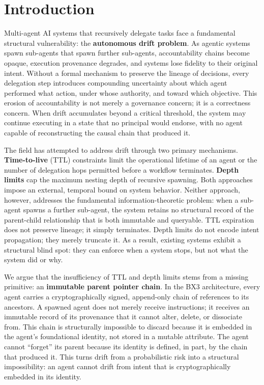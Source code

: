 \section{Introduction}

Multi-agent AI systems that recursively delegate tasks face a fundamental structural vulnerability: the \textbf{autonomous drift problem}. As agentic systems spawn sub-agents that spawn further sub-agents, accountability chains become opaque, execution provenance degrades, and systems lose fidelity to their original intent. Without a formal mechanism to preserve the lineage of decisions, every delegation step introduces compounding uncertainty about which agent performed what action, under whose authority, and toward which objective. This erosion of accountability is not merely a governance concern; it is a correctness concern. When drift accumulates beyond a critical threshold, the system may continue executing in a state that no principal would endorse, with no agent capable of reconstructing the causal chain that produced it.

The field has attempted to address drift through two primary mechanisms. \textbf{Time-to-live} (TTL) constraints limit the operational lifetime of an agent or the number of delegation hops permitted before a workflow terminates. \textbf{Depth limits} cap the maximum nesting depth of recursive spawning. Both approaches impose an external, temporal bound on system behavior. Neither approach, however, addresses the fundamental information-theoretic problem: when a sub-agent spawns a further sub-agent, the system retains no structural record of the parent-child relationship that is both immutable and queryable. TTL expiration does not preserve lineage; it simply terminates. Depth limits do not encode intent propagation; they merely truncate it. As a result, existing systems exhibit a structural blind spot: they can enforce when a system stops, but not what the system did or why.

We argue that the insufficiency of TTL and depth limits stems from a missing primitive: an \textbf{immutable parent pointer chain}. In the BX3 architecture, every agent carries a cryptographically signed, append-only chain of references to its ancestors. A spawned agent does not merely receive instructions; it receives an immutable record of its provenance that it cannot alter, delete, or dissociate from. This chain is structurally impossible to discard because it is embedded in the agent's foundational identity, not stored in a mutable attribute. The agent cannot ``forget'' its parent because its identity is defined, in part, by the chain that produced it. This turns drift from a probabilistic risk into a structural impossibility: an agent cannot drift from intent that is cryptographically embedded in its identity.

